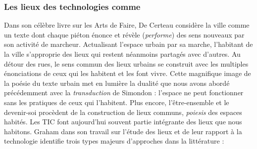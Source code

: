 \subsubsection{Les lieux des technologies comme }
Dans son célèbre livre sur les Arts de Faire, De Certeau \citep{DeCerteau1980} considère la ville comme un texte dont chaque piéton énonce et révèle (\textit{performe}) des sens nouveaux par son activité de marcheur. Actualisant l’espace urbain par sa marche, l’habitant de la ville s’approprie des lieux qui restent néanmoins partagés avec d’autres. Au détour des rues, le sens commun des lieux urbains se construit avec les multiples énonciations de ceux qui les habitent et les font vivre. Cette magnifique image de la poésie du texte urbain met en lumière la dualité que nous avons abordé précédemment avec la \textit{transduction} de Simondon : l’espace ne peut fonctionner sans les pratiques de ceux qui l’habitent. Plus encore, l’être-ensemble et le devenir-soi procèdent de la construction de lieux communs, \textit{poiesis} des espaces habités. Les TIC font aujourd’hui souvent partie intégrante des lieux que nous habitons. Graham \citep{Graham1998} dans son travail sur l’étude des lieux et de leur rapport à la technologie identifie trois types majeurs d’approches dans la littérature :


